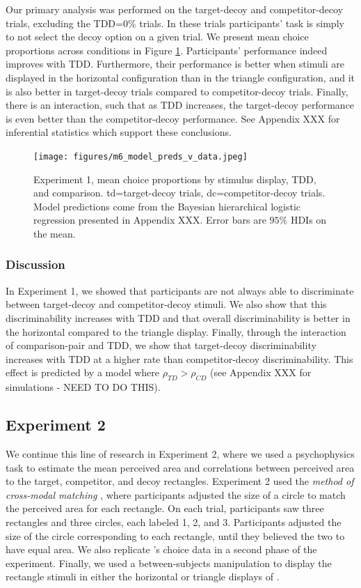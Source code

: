 \documentclass{umassthesis}          %
\begin{document}
Our primary analysis was performed on the target-decoy and competitor-decoy trials, excluding the TDD=$0\%$ trials. In these trials participants' task is simply to not select the decoy option on a given trial. We present mean choice proportions across conditions in Figure \ref{fig:e1_data}. Participants' performance indeed improves with TDD. Furthermore, their performance is better when stimuli are displayed in the horizontal configuration than in the triangle configuration, and it is also better in target-decoy trials compared to competitor-decoy trials. Finally, there is an interaction, such that as TDD increases, the target-decoy performance is even better than the competitor-decoy performance. See Appendix XXX for inferential statistics which support these conclusions.

\begin{figure}
   \texttt{[image: figures/m6\_model\_preds\_v\_data.jpeg]}
   \caption{Experiment 1, mean choice proportions by stimulus display, TDD, and comparison. td=target-decoy trials, dc=competitor-decoy trials. Model predictions come from the Bayesian hierarchical logistic regression presented in Appendix XXX. Error bars are $95\%$ HDIs on the mean.}
   \label{fig:e1_data}
\end{figure}

\subsubsection{Discussion}
In Experiment 1, we showed that participants are not always able to discriminate between target-decoy and competitor-decoy stimuli. We also show that this discriminability increases with TDD and that overall discriminability is better in the horizontal compared to the triangle display. Finally, through the interaction of comparison-pair and TDD, we show that target-decoy discriminability increases with TDD at a higher rate than competitor-decoy discriminability. This effect is predicted by a model where $\rho_{TD}>\rho_{CD}$ (see Appendix XXX for simulations - NEED TO DO THIS).

\subsection{Experiment 2}
We continue this line of research in Experiment 2, where we used a psychophysics task to estimate the mean perceived area and correlations between perceived area to the target, competitor, and decoy rectangles. Experiment 2 used the \textit{method of cross-modal matching} \parencite{stevensCrossmodalityMatchingBrightness1965}, where participants adjusted the size of a circle to match the perceived area for each rectangle. On each trial, participants saw three rectangles and three circles, each labeled 1, 2, and 3. Participants adjusted the size of the circle corresponding to each rectangle, until they believed the two to have equal area. We also replicate \textcite{spektorWhenGoodLooks2018b}'s choice data in a second phase of the experiment. Finally, we used a between-subjects manipulation to display the rectangle stimuli in either the horizontal or triangle displays of \textcite{spektorWhenGoodLooks2018b}.
\end{document}
